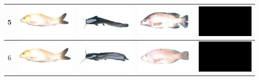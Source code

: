 \begin{longtable}{|c|c|c|c|c|}
    5 & \includegraphics[width=3cm]{gambar/emas/M05} & \includegraphics[width=3cm]{gambar/lele/L05} & \includegraphics[width=3cm]{gambar/nila/N05} & \includegraphics[width=3cm]{gambar/negative_examples/N5} \\
    \hline
    6 & \includegraphics[width=3cm]{gambar/emas/M06} & \includegraphics[width=3cm]{gambar/lele/L06} & \includegraphics[width=3cm]{gambar/nila/N06} & \includegraphics[width=3cm]{gambar/negative_examples/N6} \\
    \hline

\end{longtable}
